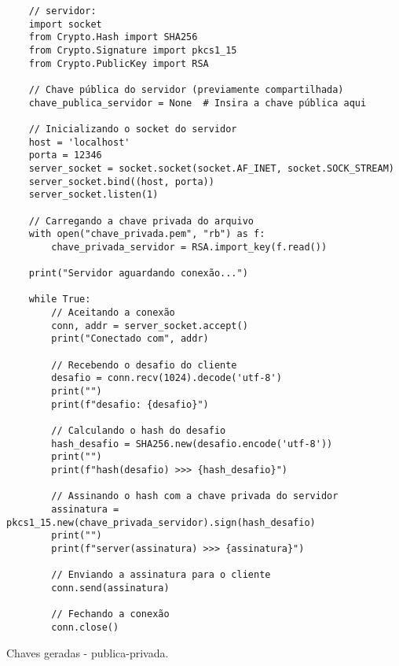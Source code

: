\documentclass[a4paper,12pt]{article}
\newcommand{\printingbibliography}{%

    \pagestyle{myheadings}
    \markright{}
    \sloppy
    \printbibliography[heading=bibintoc, %
                   title=Refer\^encias %
                  ]
    \fussy%
}
\begin{document}
\begin{listing}[!ht]
\begin{verbatim}
    // servidor:
    import socket
    from Crypto.Hash import SHA256
    from Crypto.Signature import pkcs1_15
    from Crypto.PublicKey import RSA

    // Chave pública do servidor (previamente compartilhada)
    chave_publica_servidor = None  # Insira a chave pública aqui

    // Inicializando o socket do servidor
    host = 'localhost'
    porta = 12346
    server_socket = socket.socket(socket.AF_INET, socket.SOCK_STREAM)
    server_socket.bind((host, porta))
    server_socket.listen(1)

    // Carregando a chave privada do arquivo
    with open("chave_privada.pem", "rb") as f:
        chave_privada_servidor = RSA.import_key(f.read())

    print("Servidor aguardando conexão...")

    while True:
        // Aceitando a conexão
        conn, addr = server_socket.accept()
        print("Conectado com", addr)

        // Recebendo o desafio do cliente
        desafio = conn.recv(1024).decode('utf-8')
        print("")
        print(f"desafio: {desafio}")

        // Calculando o hash do desafio
        hash_desafio = SHA256.new(desafio.encode('utf-8'))
        print("")
        print(f"hash(desafio) >>> {hash_desafio}")

        // Assinando o hash com a chave privada do servidor
        assinatura = pkcs1_15.new(chave_privada_servidor).sign(hash_desafio)
        print("")
        print(f"server(assinatura) >>> {assinatura}")

        // Enviando a assinatura para o cliente
        conn.send(assinatura)

        // Fechando a conexão
        conn.close()    
\end{verbatim}
\caption{Chaves geradas - publica-privada.}
\end{listing}


\printingbibliography
\end{document}
